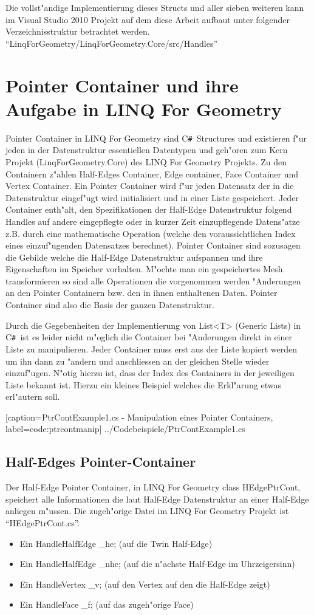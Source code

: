 \documentclass[pagesize, paper=a4, fontsize=12pt,titlepage=true, headings=small, headnosepline, abstractoff, liststotoc, nochapterprefix, plainheadsepline]{scrreprt}
\newcommand{\CSS}{C\texttt{\# }}
\newcommand{\LFG}{LINQ For Geometry}
\newcommand{\LFGS}{LINQ For Geometry }
\newcommand{\HES}{Half-Edge Datenstruktur }
\begin{document}
Die vollst"andige Implementierung dieses Structs und aller sieben weiteren kann im Visual Studio 2010 Projekt auf dem diese Arbeit aufbaut unter folgender Verzeichnisstruktur betrachtet werden. "`LinqForGeometry/LinqForGeometry.Core/src/Handles"'

\section {Pointer Container und ihre Aufgabe in \LFG}
		Pointer Container in \LFGS sind \CSS Structures und existieren f"ur jeden in der Datenstruktur essentiellen Datentypen und geh"oren zum Kern Projekt (LinqForGeometry.Core) des \LFGS Projekts. Zu den Containern z"ahlen Half-Edges Container, Edge container, Face Container und Vertex Container. Ein Pointer Container wird f"ur jeden Datensatz der in die Datenstruktur eingef"ugt wird initialisiert und in einer Liste gespeichert. Jeder Container enth"alt, den Spezifikationen der \HES folgend Handles auf andere eingepflegte oder in kurzer Zeit einzupflegende Datens"atze z.B. durch eine mathematische Operation (welche den voraussichtlichen Index eines einzuf"ugenden Datensatzes berechnet). Pointer Container sind sozusagen die Gebilde welche die Half-Edge Datenstruktur aufspannen und ihre Eigenschaften im Speicher vorhalten. M"ochte man ein gespeichertes Mesh transformieren so sind alle Operationen die vorgenommen werden "Anderungen an den Pointer Containern bzw. den in ihnen enthaltenen Daten. Pointer Container sind also die Basis der ganzen Datenstruktur.
\newline

Durch die Gegebenheiten der Implementierung von List<T> (Generic Lists) in \CSS ist es leider nicht m"oglich die Container bei "Anderungen direkt in einer Liste zu manipulieren. Jeder Container muss erst aus der Liste kopiert werden um ihn dann zu "andern und anschliessen an der gleichen Stelle wieder einzuf"ugen. N"otig hierzu ist, dass der Index des Containers in der jeweiligen Liste bekannt ist. Hierzu ein kleines Beispiel welches die Erkl"arung etwas erl"autern soll.

			[caption={PtrContExample1.cs - Manipulation eines Pointer Containers}, label=code:ptrcontmanip]
			{../Codebeispiele/PtrContExample1.cs}
\newpage
\subsection {Half-Edges Pointer-Container}
			Der Half-Edge Pointer Container, in \LFGS class HEdgePtrCont, speichert alle Informationen die laut \HES an einer Half-Edge anliegen m"ussen. Die zugeh"orige Datei im \LFGS Projekt ist "`HEdgePtrCont.cs"'.
\begin{itemize}
\item Ein HandleHalfEdge \_he; (auf die Twin Half-Edge)
\item Ein HandleHalfEdge \_nhe; (auf die n"achste Half-Edge im Uhrzeigersinn)
\item Ein HandleVertex \_v; (auf den Vertex auf den die Half-Edge zeigt)
\item Ein HandleFace \_f; (auf das zugeh"orige Face)
\end{itemize}
\end{document}
